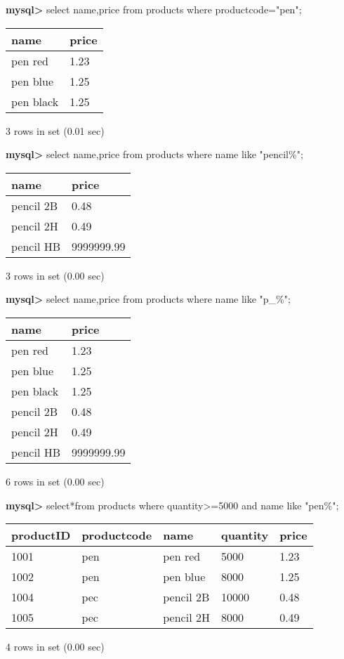 \documentclass[11pt]{article}
\begin{document}
\textbf{mysql>} select name,price from products where productcode="pen";
\begin{center}
\begin{tabular}{|l|l|}
\hline
name & price \\
\hline
pen red & 1.23 \\
pen blue & 1.25 \\
pen black & 1.25 \\
\hline
\end{tabular}
\end{center}
3 rows in set (0.01 sec)

\textbf{mysql>} select name,price from products where name like "pencil\%";
\begin{center}
\begin{tabular}{|l|l|}
\hline
name & price \\
\hline
pencil 2B & 0.48 \\
pencil 2H & 0.49 \\
pencil HB & 9999999.99 \\
\hline
\end{tabular}
\end{center}
3 rows in set (0.00 sec)

\textbf{mysql>} select name,price from products where name like "p\_\%";
\begin{center}
\begin{tabular}{|l|l|}
\hline
name & price \\
\hline
pen red & 1.23 \\
pen blue & 1.25 \\
pen black & 1.25 \\
pencil 2B & 0.48 \\
pencil 2H & 0.49 \\
pencil HB & 9999999.99 \\
\hline
\end{tabular}
\end{center}
6 rows in set (0.00 sec)

\textbf{mysql>} select*from products where quantity>=5000 and name like "pen\%";
\begin{center}
\begin{tabular}{|l|l|l|l|l|}
\hline
productID & productcode & name & quantity & price \\
\hline
1001 & pen & pen red & 5000 & 1.23 \\
1002 & pen & pen blue & 8000 & 1.25 \\
1004 & pec & pencil 2B & 10000 & 0.48 \\
1005 & pec & pencil 2H & 8000 & 0.49 \\
\hline
\end{tabular}
\end{center}
4 rows in set (0.00 sec)
\end{document}
